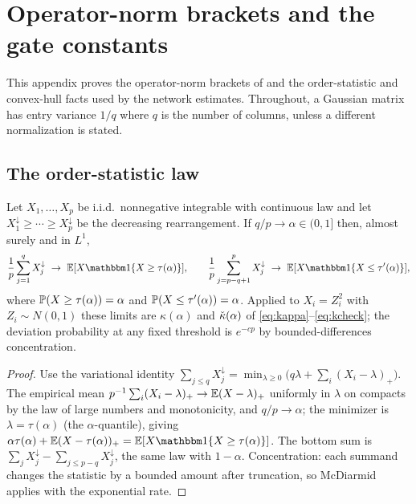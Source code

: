 \section{Operator-norm brackets and the gate constants}\label{app:brackets}

This appendix proves the operator-norm brackets of  and the order-statistic and
convex-hull facts used by the network estimates. Throughout, a Gaussian matrix has entry variance
$1/q$ where $q$ is the number of columns, unless a different normalization is stated.

\subsection{The order-statistic law}
\begin{lemma}\label{lem:order}
Let $X_1,\dots,X_p$ be i.i.d.\ nonnegative integrable with continuous law and let $X^{\downarrow}_{1}\ge\cdots\ge X^{\downarrow}_p$
be the decreasing rearrangement. If $q/p\to\alpha\in(0,1]$ then, almost surely and in $L^1$,
\[
  \frac1p\sum_{j=1}^q X^{\downarrow}_j\ \to\ \EE[X\one\{X\ge\tau(\alpha)\}],\qquad
  \frac1p\sum_{j=p-q+1}^p X^{\downarrow}_j\ \to\ \EE[X\one\{X\le\tau'(\alpha)\}],
\]
where $\mathbb{P}(X\ge\tau(\alpha))=\alpha$ and $\mathbb{P}(X\le\tau'(\alpha))=\alpha$. Applied to $X_i=Z_i^2$ with
$Z_i\sim N(0,1)$ these limits are $\kappa(\alpha)$ and $\check{\kappa}(\alpha)$ of \eqref{eq:kappa}--\eqref{eq:kcheck};
the deviation probability at any fixed threshold is $e^{-cp}$ by bounded-differences concentration.
\end{lemma}
\begin{proof}
Use the variational identity $\sum_{j\le q}X^{\downarrow}_j=\min_{\lambda\ge0}\bigl(q\lambda+\sum_i(X_i-\lambda)_+\bigr)$.
The empirical mean $p^{-1}\sum_i(X_i-\lambda)_+\to\mathbb{E}(X-\lambda)_+$ uniformly in $\lambda$ on compacts by
the law of large numbers and monotonicity, and $q/p\to\alpha$; the minimizer is $\lambda=\tau(\alpha)$
(the $\alpha$-quantile), giving $\alpha\tau(\alpha)+\EE(X-\tau(\alpha))_+=\EE[X\one\{X\ge\tau(\alpha)\}]$.
The bottom sum is $\sum_j X^{\downarrow}_j-\sum_{j\le p-q}X^{\downarrow}_j$, the same law with $1-\alpha$.
Concentration: each summand changes the statistic by a bounded amount after truncation, so McDiarmid
applies with the exponential rate.
\end{proof}

